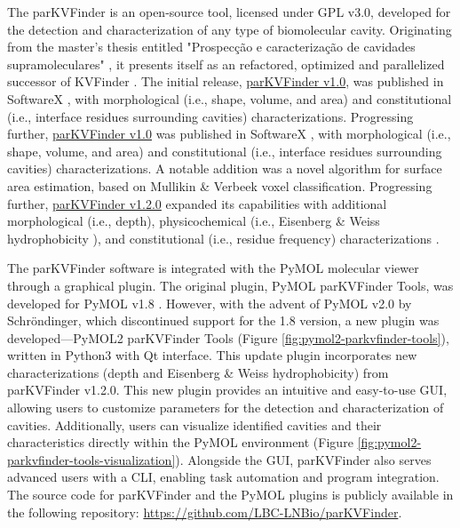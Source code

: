 \documentclass[Ingles]{phdthesis}
\def\ie{i.e.\onedot}
\begin{document}
The \ac{parKVFinder} \cite{guerra2020} is an open-source tool, licensed under GPL v3.0, developed for the detection and characterization of any type of biomolecular cavity. Originating from the master's thesis entitled "Prospecção e caracterização de cavidades supramoleculares" \cite{guerra2019}, it presents itself as an refactored, optimized and parallelized successor of KVFinder \cite{oliveira2014}. The initial release, \href{https://github.com/LBC-LNBio/parKVFinder/tree/v1.0}{parKVFinder v1.0}, was published in SoftwareX \cite{guerra2020}, with morphological (\ie, shape, volume, and area) and constitutional (\ie, interface residues surrounding cavities) characterizations. Progressing further, \href{https://github.com/LBC-LNBio/parKVFinder/tree/v1.0}{parKVFinder v1.0} was published in SoftwareX \cite{guerra2020}, with morphological (\ie, shape, volume, and area) and constitutional (\ie, interface residues surrounding cavities) characterizations. A notable addition was a novel algorithm for surface area estimation, based on Mullikin & Verbeek voxel classification. Progressing further, \href{https://github.com/LBC-LNBio/parKVFinder/tree/v1.2.0}{parKVFinder v1.2.0} expanded its capabilities with additional morphological (\ie, depth), physicochemical (\ie, Eisenberg & Weiss hydrophobicity \cite{eisenberg1984}), and constitutional (\ie, residue frequency) characterizations \cite{guerra2023A}. 

The parKVFinder software is integrated with the PyMOL molecular viewer \cite{pymol} through a graphical plugin. The original plugin, PyMOL parKVFinder Tools, was developed for PyMOL v1.8 \cite{guerra2019,guerra2020}. However, with the advent of PyMOL v2.0 by Schröndinger, which discontinued support for the 1.8 version, a new plugin was developed---PyMOL2 parKVFinder Tools (Figure \ref{fig:pymol2-parkvfinder-tools}), written in Python3 with Qt interface. This update plugin incorporates new characterizations (depth and Eisenberg & Weiss hydrophobicity) from parKVFinder v1.2.0. This new plugin provides an intuitive and easy-to-use \ac{GUI}, allowing users to customize parameters for the detection and characterization of cavities.  Additionally, users can visualize identified cavities and their characteristics directly within the PyMOL environment (Figure \ref{fig:pymol2-parkvfinder-tools-visualization}). Alongside the \acs{GUI}, parKVFinder also serves advanced users with a \ac{CLI}, enabling task automation and program integration. The source code for parKVFinder and the PyMOL plugins is publicly available in the following repository: \url{https://github.com/LBC-LNBio/parKVFinder}.
\end{document}
